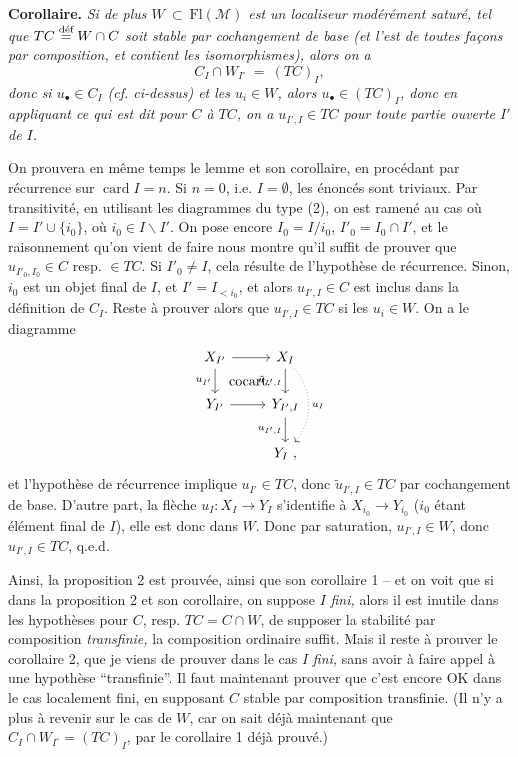 \documentclass[11pt]{article}
\newcommand{\printedpage}[1]{\marginpar{\footnotesize p.~#1}}
\newcommand{\msp}[1]{\marginpar{\footnotesize [#1]}}
\newcommand{\cocart}{\textup{cocart.}}
\begin{document}
\textbf{Corollaire.} \textit{Si de plus $W \ \subset\ \mathrm{Fl}(\mathcal{M})$ est un localiseur modérément saturé, tel que $TC \overset{\textup{déf}}{=} W \cap C$ soit stable par cochangement de base (et l'est de toutes façons par composition, et contient les isomorphismes), alors on a}
\[
C_I \cap W_{I^\circ} \ = \ (TC)_I,
\]
\textit{donc si $u_\bullet \in C_I$ (cf. ci-dessus) et les $u_i \in W$, alors $u_\bullet \in (TC)_I$, donc en appliquant ce qui est dit pour $C$ à $TC$, on a $u_{I',I} \in TC$ pour toute} \msp{page 19} \textit{partie ouverte $I'$ de $I$.}

On prouvera en même temps le lemme et son corollaire, en procédant par récurrence sur $\operatorname{card} I = n$. Si $n = 0$, i.e. $I = \emptyset$, les énoncés sont triviaux. Par transitivité, en utilisant les diagrammes du type (2), on est ramené au cas où $I = I' \cup \{i_0\}$, où $i_0 \in I \backslash I'$. On pose encore $I_0 = I/i_0$, $I'_0 = I_0 \cap I'$, et le raisonnement qu'on vient de faire nous montre qu'il suffit de prouver que $u_{I'_0,I_0} \in C$ resp. $\in TC$. Si $I'_0 \neq I$, cela résulte de l'hypothèse de récurrence. %
Sinon, $i_0$ est un objet final de $I$, et $I' = I_{<i_0}$, et alors $u_{I',I} \in C$ est inclus dans la définition de $C_I$. Reste à prouver alors que $u_{I',I} \in TC$ si les $u_i \in W$. On a le diagramme
\printedpage{12}
\[
\begin{tikzcd}
X_{I'} \arrow[r] \arrow[d, "u_{I'}"'] \arrow[dr, phantom, "\cocart"] & X_I \arrow[d, "\tilde{u}_{I',I}"'] \arrow[dd, dotted, bend left=40, "u_I"] \\
Y_{I'} \arrow[r] & Y_{I',I} \arrow[d, "u_{I',I}"'] \\
 & Y_I\ ,
\end{tikzcd}
\]
\msp{page 20} et l'hypothèse de récurrence implique $u_{I'} \in TC$, donc $\tilde{u}_{I',I} \in TC$ par cochangement de base. D'autre part, la flèche $u_I : X_I \longrightarrow Y_I$ s'identifie à $X_{i_0} \longrightarrow Y_{i_0}$ ($i_0$ étant élément final de $I$), elle est donc dans $W$. Donc par saturation, $u_{I',I} \in W$, donc $u_{I',I} \in TC$, q.e.d.

Ainsi, la proposition 2 est prouvée, ainsi que son corollaire 1 -- et on voit que si dans la proposition 2 et son corollaire, on suppose $I$ \textit{fini,} alors il est inutile dans les hypothèses pour $C$, resp. $TC = C \cap W$, de supposer la stabilité par composition \textit{transfinie,} la composition ordinaire suffit. Mais il reste à prouver le corollaire 2, que je viens de prouver dans le cas $I$ \textit{fini,} sans avoir à faire appel à une hypothèse ``transfinie''. Il faut maintenant prouver que c'est encore OK dans le cas localement fini, en supposant $C$ stable par composition transfinie. (Il n'y a plus à revenir sur le cas de $W$, car on sait déjà maintenant que $C_I \cap W_{I^\circ} = (TC)_I$, par le corollaire 1 déjà prouvé.)
\end{document}
